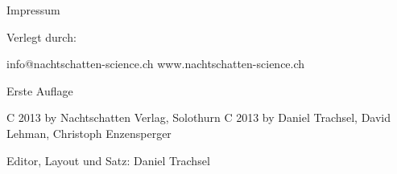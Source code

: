 Impressum

Verlegt durch:

info@nachtschatten-science.ch
www.nachtschatten-science.ch


Erste Auflage

C 2013 by Nachtschatten Verlag, Solothurn
C 2013 by Daniel Trachsel, David Lehman, Christoph Enzensperger

Editor, Layout und Satz: Daniel Trachsel